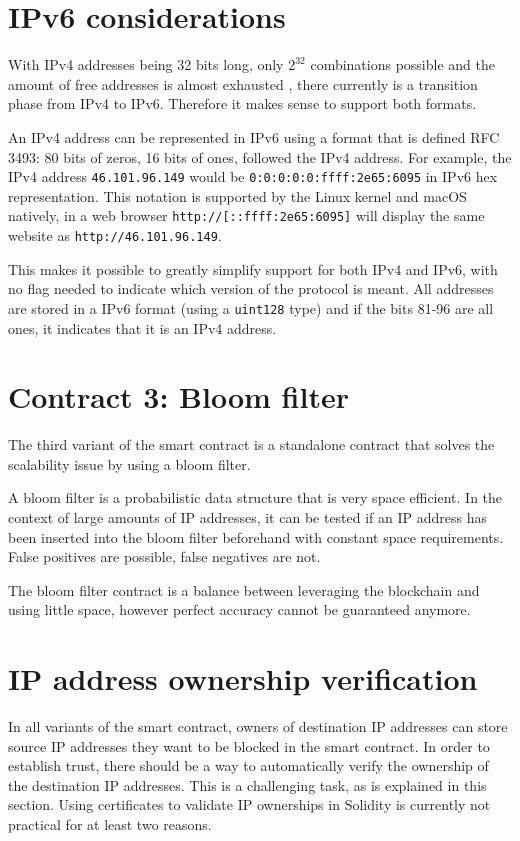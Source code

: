 \section{IPv6 considerations}

With IPv4 addresses being 32 bits long, only $ 2^{32} $ combinations possible and the amount of free addresses is almost exhausted \cite{IPv4Exhaustion}, there currently is a transition phase from IPv4 to IPv6. Therefore it makes sense to support both formats.

An IPv4 address can be represented in IPv6 using a format that is defined RFC 3493: 80 bits of zeros, 16 bits of ones, followed the IPv4 address. For example, the IPv4 address \texttt{46.101.96.149} would be \texttt{0:0:0:0:0:ffff:2e65:6095} in IPv6 hex representation. This notation is supported by the Linux kernel and macOS natively, in a web browser \texttt{http://[::ffff:2e65:6095]} will display the same website as \texttt{http://46.101.96.149}.

This makes it possible to greatly simplify support for both IPv4 and IPv6, with no flag needed to indicate which version of the protocol is meant. All addresses are stored in a IPv6 format (using a \texttt{uint128} type) and if the bits 81-96 are all ones, it indicates that it is an IPv4 address.




\section{Contract 3: Bloom filter}

The third variant of the smart contract is a standalone contract that solves the scalability issue by using a bloom filter.

A bloom filter is a probabilistic data structure that is very space efficient. In the context of large amounts of IP addresses, it can be tested if an IP address has been inserted into the bloom filter beforehand with constant space requirements. False positives are possible, false negatives are not.

The bloom filter contract is a balance between leveraging the blockchain and using little space, however perfect accuracy cannot be guaranteed anymore.

\section{IP address ownership verification}
In all variants of the smart contract, owners of destination IP addresses can store source IP addresses they want to be blocked in the smart contract. In order to establish trust, there should be a way to automatically verify the ownership of the destination IP addresses. This is a challenging task, as is explained in this section. Using certificates to validate IP ownerships in Solidity is currently not practical for at least two reasons.

